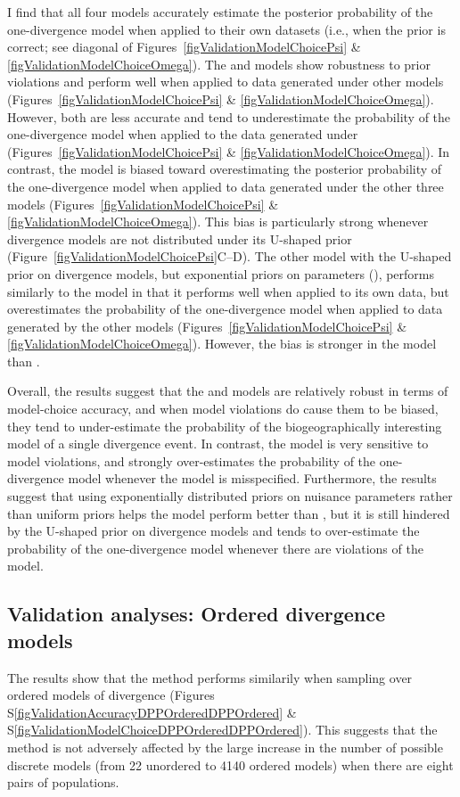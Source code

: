 I find that all four models accurately estimate the posterior probability of
the one-divergence model when applied to their own datasets (i.e., when the
prior is correct; see diagonal of Figures~\ref{figValidationModelChoicePsi} \&
\ref{figValidationModelChoiceOmega}).
The \modelUniform and \modelDPP models show robustness to prior violations and
perform well when applied to data generated under other models
(Figures~\ref{figValidationModelChoicePsi} \&
\ref{figValidationModelChoiceOmega}).
However, both are less accurate and tend to underestimate the probability of the
one-divergence model when applied to the data generated under \modelUshaped
(Figures~\ref{figValidationModelChoicePsi} \&
\ref{figValidationModelChoiceOmega}).
In contrast, the \modelOld model is biased toward overestimating the posterior
probability of the one-divergence model when applied to data generated under
the other three models
(Figures~\ref{figValidationModelChoicePsi} \&
\ref{figValidationModelChoiceOmega}).
This bias is particularly strong whenever divergence models are not
distributed under its U-shaped prior
(Figure~\ref{figValidationModelChoicePsi}C--D).
The other model with the U-shaped prior on divergence models, but exponential
priors on parameters (\modelUshaped), performs similarly to the \modelOld model
in that it performs well when applied to its own data, but overestimates the
probability of the one-divergence model when applied to data generated by the
other models
(Figures~\ref{figValidationModelChoicePsi} \&
\ref{figValidationModelChoiceOmega}).
However, the bias is stronger in the \modelOld model than \modelUshaped.

Overall, the results suggest that the \modelDPP and \modelUniform models are
relatively robust in terms of model-choice accuracy, and when model violations
do cause them to be biased, they tend to under-estimate the probability of the
biogeographically interesting model of a single divergence event.
In contrast, the \modelOld model is very sensitive to model violations, and
strongly over-estimates the probability of the one-divergence model whenever
the model is misspecified.
Furthermore, the results suggest that using exponentially distributed priors on
nuisance parameters rather than uniform priors helps the \modelUshaped model
perform better than \modelOld, but it is still hindered by the U-shaped prior
on divergence models and tends to over-estimate the probability of the
one-divergence model whenever there are violations of the model.


\subsection{Validation analyses: Ordered divergence models}
The results show that the method performs similarily when sampling over ordered
models of divergence
(Figures S\ref{figValidationAccuracyDPPOrderedDPPOrdered} \&
S\ref{figValidationModelChoiceDPPOrderedDPPOrdered}).
This suggests that the method is not adversely affected by the large increase
in the number of possible discrete models (from 22 unordered to 4140 ordered
models) when there are eight pairs of populations.

